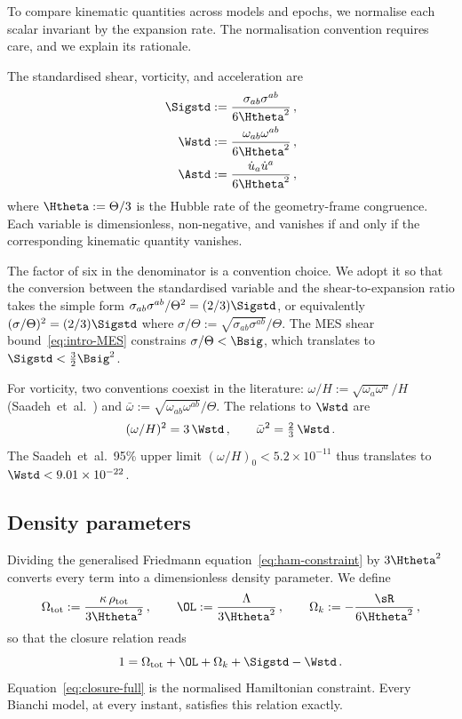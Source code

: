 To compare kinematic quantities across models and epochs, we
normalise each scalar invariant by the expansion rate.  The
normalisation convention requires care, and we explain its
rationale.

\begin{definition}\label{def:std-vars}
The standardised shear, vorticity, and acceleration are
\begin{align}
\Sigstd &:= \frac{\sigma_{ab}\sigma^{ab}}{6\Htheta^2}\,,
\label{eq:Sigstd-def}\\
\Wstd   &:= \frac{\omega_{ab}\omega^{ab}}{6\Htheta^2}\,,
\label{eq:Wstd-def}\\
\Astd   &:= \frac{\dot{u}_a\dot{u}^a}{6\Htheta^2}\,,
\label{eq:Astd-def}
\end{align}
where $\Htheta := \Theta/3$ is the Hubble rate of the
geometry-frame congruence.  Each variable is dimensionless,
non-negative, and vanishes if and only if the corresponding
kinematic quantity vanishes.
\end{definition}

The factor of six in the denominator is a convention choice.
We adopt it so that the conversion between the standardised
variable and the shear-to-expansion ratio takes the simple form
$\sigma_{ab}\sigma^{ab}/\Theta^2 = (2/3)\Sigstd$, or
equivalently $(\sigma/\Theta)^2 = (2/3)\Sigstd$ where
$\sigma/\Theta := \sqrt{\sigma_{ab}\sigma^{ab}}/\Theta$.
The MES shear bound~\eqref{eq:intro-MES} constrains
$\sigma/\Theta < \Bsig$, which translates to
$\Sigstd < \tfrac{3}{2}\Bsig^2$.

For vorticity, two conventions coexist in the literature:
$\omega/H := \sqrt{\omega_a\omega^a}/H$
(Saadeh~et~al.~\cite{Saadeh2016b}) and
$\bar{\omega} := \sqrt{\omega_{ab}\omega^{ab}}/\Theta$.
The relations to $\Wstd$ are
\begin{equation}\label{eq:omH-W2}
(\omega/H)^2 = 3\,\Wstd\,,\qquad
\bar{\omega}^2 = \tfrac{2}{3}\,\Wstd\,.
\end{equation}
The Saadeh~et~al.\ 95\% upper limit
$(\omega/H)_0 < 5.2 \times 10^{-11}$ thus translates to
$\Wstd < 9.01 \times 10^{-22}$.


\subsection{Density parameters}\label{sec:density-params}

Dividing the generalised Friedmann
equation~\eqref{eq:ham-constraint} by $3\Htheta^2$ converts
every term into a dimensionless density parameter.  We define
\begin{equation}\label{eq:density-params}
\Omega_{\mathrm{tot}} := \frac{\kappa\,\rho_{\mathrm{tot}}}{3\Htheta^2}\,,\qquad
\OL := \frac{\Lambda}{3\Htheta^2}\,,\qquad
\Omega_k := -\frac{\sR}{6\Htheta^2}\,,
\end{equation}
so that the closure relation reads
\begin{equation}\label{eq:closure-full}
1 = \Omega_{\mathrm{tot}} + \OL + \Omega_k
  + \Sigstd - \Wstd\,.
\end{equation}
Equation~\eqref{eq:closure-full} is the normalised Hamiltonian constraint.  Every Bianchi
model, at every instant, satisfies this relation exactly.


